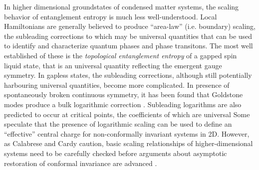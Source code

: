 \documentclass[prl,aps,twocolumn,floatfix,amsmath,amssymb,superscriptaddress,tightenlines]{revtex4}
\begin{document}
In higher dimensional groundstates of condensed matter systems, the scaling behavior of
entanglement entropy is much less well-understood.  Local Hamiltonians
are generally believed to produce ``area-law'' (i.e. boundary) scaling, the subleading corrections
to which may be universal quantities that can be used to identify and characterize
quantum phases and phase transitons.
The most well established of these is the {\it topological entanglement entropy} \cite{KP,LW} of a gapped
spin liquid state, that is an universal quantity reflecting the emergent gauge symmetry.
In gapless states, the subleading corrections, although still potentially harbouring universal 
quantities, become more complicated.
In presence of spontaneously broken continuous symmetry, it has been found that Goldstone modes 
produce a bulk logarithmic correction \cite{HeisLog,MaxLog}.
Subleading logarithms are also predicted to occur at critical points, the coefficients of which are universal \cite{Max}
Some speculate that the presence of logarithmic scaling can be used to define an ``effective'' central
charge for non-conformally invariant systems in 2D. %
However, as Calabrese and Cardy caution, basic scaling relationships of
higher-dimensional systems need to be carefully checked before
arguments about asymptotic restoration of conformal invariance are
advanced \cite{EE_CFT}.
\end{document}
